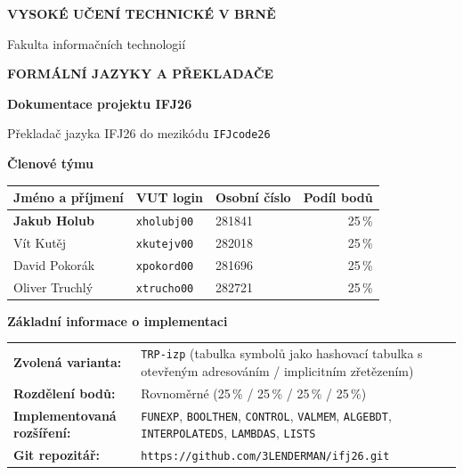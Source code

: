 \documentclass[11pt, a4paper]{article}
\renewcommand{\arraystretch}{1.15}%
\begin{document}
\begin{titlepage}
  \vspace*{0.4cm}

  {\normalsize\bfseries VYSOKÉ UČENÍ TECHNICKÉ V BRNĚ \par}
  {\normalsize Fakulta informačních technologií \par}

  \vspace{1.5cm}

  {\small\bfseries FORMÁLNÍ JAZYKY A PŘEKLADAČE \par}
  \vspace{0.2cm}
  {\fontsize{26}{32}\selectfont\bfseries Dokumentace projektu IFJ26 \par}
  \vspace{0.3cm}
  {\Large Překladač jazyka IFJ26 do mezikódu \texttt{IFJcode26} \par}

  \vspace{1.2cm}

  {\large\bfseries Členové týmu \par}
  \vspace{0.25cm}
  \renewcommand{\arraystretch}{1.35}
  \begin{tabularx}{\textwidth}{@{}X l l r@{}}
    \toprule
    \textbf{Jméno a příjmení} & \textbf{VUT login} & \textbf{Osobní číslo} & \textbf{Podíl bodů} \\
    \midrule
    \textbf{Jakub Holub} & \texttt{xholubj00} & 281841 & 25\,\% \\
    Vít Kutěj & \texttt{xkutejv00} & 282018 & 25\,\% \\
    David Pokorák & \texttt{xpokord00} & 281696 & 25\,\% \\
    Oliver Truchlý & \texttt{xtrucho00} & 282721 & 25\,\% \\
    \bottomrule
  \end{tabularx}

  \vspace{1.2cm}

  {\large\bfseries Základní informace o implementaci\par}
  \vspace{0.25cm}
  \renewcommand{\arraystretch}{1.35}
  \begin{tabularx}{\textwidth}{@{}>{\bfseries}l X@{}}
    Zvolená varianta: & \texttt{TRP-izp} (tabulka symbolů jako hashovací tabulka s otevřeným adresováním / implicitním zřetězením) \\
    Rozdělení bodů: & Rovnoměrné (25\,\% / 25\,\% / 25\,\% / 25\,\%) \\
    Implementovaná rozšíření: & \texttt{FUNEXP}, \texttt{BOOLTHEN}, \texttt{CONTROL}, \texttt{VALMEM}, \texttt{ALGEBDT}, \texttt{INTERPOLATEDS}, \texttt{LAMBDAS}, \texttt{LISTS} \\
    Git repozitář: & \texttt{https://github.com/3LENDERMAN/ifj26.git} \\
  \end{tabularx}


\end{titlepage}
\end{document}
